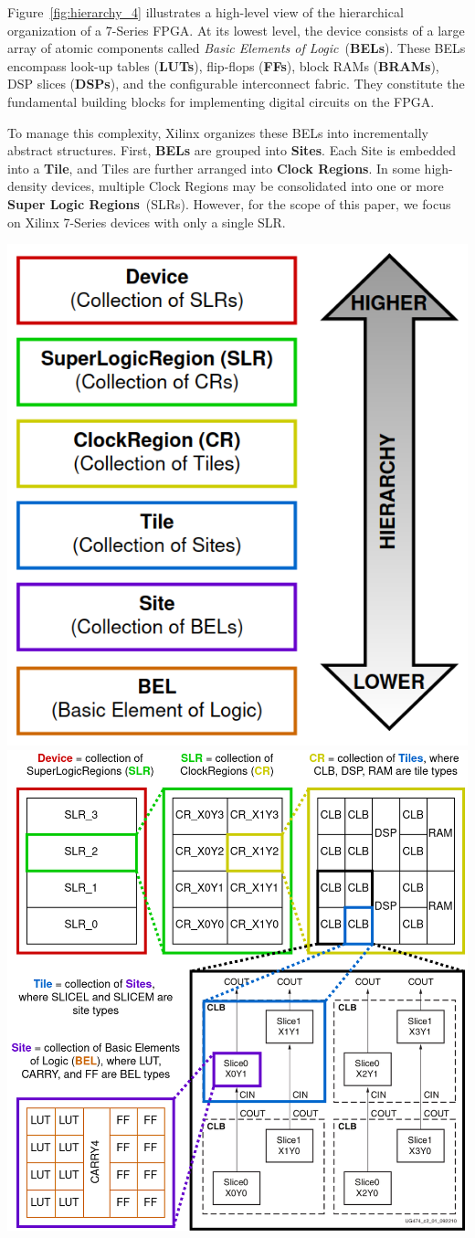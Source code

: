 \documentclass{article}
\begin{document}
\begin{multicols}{2}
    Figure~\ref{fig:hierarchy_4} illustrates a high-level view of the hierarchical organization of a 7-Series FPGA. 
    At its lowest level, the device consists of a large array of atomic components called \emph{Basic Elements of Logic}~(\textbf{BELs}). 
    These BELs encompass look-up tables (\textbf{LUTs}), flip-flops (\textbf{FFs}), block RAMs (\textbf{BRAMs}), DSP slices (\textbf{DSPs}), and the configurable interconnect fabric. 
    They constitute the fundamental building blocks for implementing digital circuits on the FPGA.

    To manage this complexity, Xilinx organizes these BELs into incrementally abstract structures. 
    First, \textbf{BELs} are grouped into \textbf{Sites}. 
    Each Site is embedded into a \textbf{Tile}, and Tiles are further arranged into \textbf{Clock Regions}. 
    In some high-density devices, multiple Clock Regions may be consolidated into one or more \textbf{Super Logic Regions}~(SLRs). 
    However, for the scope of this paper, we focus on Xilinx 7-Series devices with only a single SLR.

    \end{multicols}
    {
        \centering
        \includegraphics[valign=c, width=0.3\columnwidth]{figures/hierarchy_5.png}
        \includegraphics[valign=c, width=0.6\columnwidth]{figures/hierarchy_4.png}
        \label{fig:hierarchy_4}
    }
\end{document}
